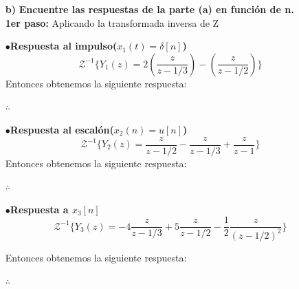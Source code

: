 \documentclass[11pt,a4paper]{article}
\begin{document}
{{\begin{enumerate}
	\begin{figure}[h]
	\centering
	\texttt{[image: IMAGENRESPUESTAESCALON]} 
	\caption{Gráfica de la respuesta al escalón}
\label{IMAGENRESPUESTAESCALON}
\end{figure}
	\newpage
	
	$\bullet$\textbf{Respuesta a $x_3[n]=(\frac{1}{2})^nu[n]$}\\\\
	si $x_3[n]=(\frac{1}{2})^nu[n]$ entonces $X_3(z)=\frac{2z}{2z-1}$; por lo que, $Y_3=\frac{2z}{2z-1}H(z)=4z[\frac{3z^2-2z}{(3z-1)(2z-1)^2}]$
        $$Y_3(z)=z[-\frac{12}{3z-1}+\frac{10}{2z-1}-\frac{2}{(2z-1)^2}]=-4\frac{z}{z-1/3}+5\frac{z}{z-1/2}-\frac{1}{2}\frac{z}{(z-1/2)^2}$$

	\begin{figure}[h]
	\centering
	\texttt{[image: IMAGENRESPUESTAUEX]} 
	\caption{Gráfica de la respuesta a $x_3[n]=(\frac{1}{2})^nu[n]$}
\label{IMAGENRESPUESTAUEX}
\end{figure}
	
	\item[\textbf{b)}]
	 \textbf{Encuentre las respuestas de la parte (a) en función de n.}\\
	  \textbf{1er paso:} Aplicando la transformada inversa de Z
	  
        $\bullet$\textbf{Respuesta al impulso($x_1(t)= \delta[n]$)}\\
        $$\mathcal{Z}^{-1}\{Y_1(z)=2(\frac{z}{z-1/3})-(\frac{z}{z-1/2})\}$$
   Entonces obtenemos la siguiente respuesta:
         \begin{center}
	$\therefore$ 
	\end{center}
            
	$\bullet$\textbf{Respuesta al escalón($x_2(n)= u[n]$)}\\
        $$\mathcal{Z}^{-1}\{Y_2(z)=\frac{z}{z-1/2}-\frac{z}{z-1/3}+\frac{z}{z-1}\}$$
        Entonces obtenemos la siguiente respuesta:
         \begin{center}
	$\therefore$ 
	\end{center} 
        
        $\bullet$\textbf{Respuesta a $x_3[n]$}\\
        $$\mathcal{Z}^{-1}\{Y_3(z)=-4\frac{z}{z-1/3}+5\frac{z}{z-1/2}-\frac{1}{2}\frac{z}{(z-1/2)^2}\}$$
         
     Entonces obtenemos la siguiente respuesta:
	\begin{center}
	$\therefore$ 
	\end{center} 


\end{enumerate}}}
\end{document}
